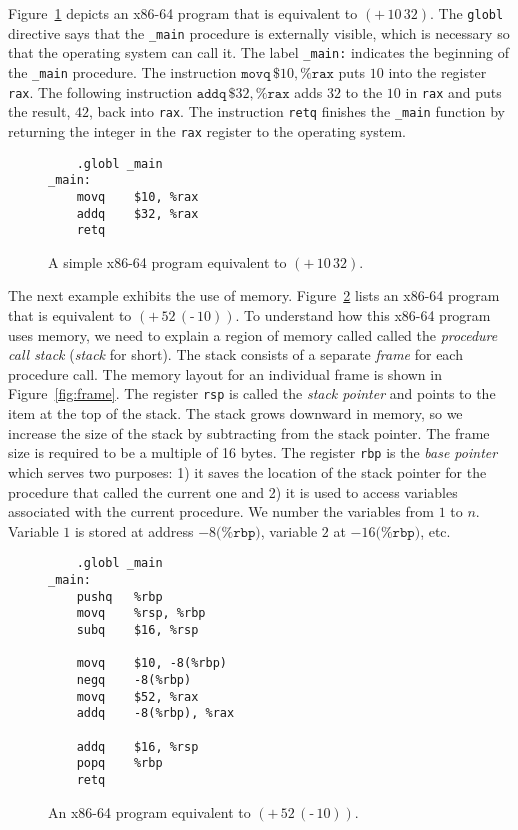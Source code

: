 \documentclass[12pt]{book}
\newcommand{\key}[1]{\texttt{#1}}
\newcommand{\UNIOP}[2]{(\key{#1}\,#2)}
\newcommand{\BINOP}[3]{(\key{#1}\,#2\,#3)}
\begin{document}
Figure~\ref{fig:p0-x86} depicts an x86-64 program that is equivalent
to $\BINOP{+}{10}{32}$. The \key{globl} directive says that the
\key{\_main} procedure is externally visible, which is necessary so
that the operating system can call it. The label \key{\_main:}
indicates the beginning of the \key{\_main} procedure.  The
instruction $\key{movq}\,\$10, \%\key{rax}$ puts $10$ into the
register \key{rax}. The following instruction $\key{addq}\,\key{\$}32,
\key{\%rax}$ adds $32$ to the $10$ in \key{rax} and puts the result,
$42$, back into \key{rax}. The instruction \key{retq} finishes the
\key{\_main} function by returning the integer in the \key{rax}
register to the operating system.

\begin{figure}[htbp]
\centering
\begin{minipage}{0.6\textwidth}
\begin{lstlisting}
	.globl _main
_main:
	movq	$10, %rax
	addq	$32, %rax
	retq
\end{lstlisting}
\end{minipage}
\caption{A simple x86-64 program equivalent to $\BINOP{+}{10}{32}$.}
\label{fig:p0-x86}
\end{figure}

The next example exhibits the use of memory.  Figure~\ref{fig:p1-x86}
lists an x86-64 program that is equivalent to $\BINOP{+}{52}{
  \UNIOP{-}{10} }$. To understand how this x86-64 program uses memory,
we need to explain a region of memory called called the
\emph{procedure call stack} (\emph{stack} for short). The stack
consists of a separate \emph{frame} for each procedure call. The
memory layout for an individual frame is shown in
Figure~\ref{fig:frame}.  The register \key{rsp} is called the
\emph{stack pointer} and points to the item at the top of the
stack. The stack grows downward in memory, so we increase the size of
the stack by subtracting from the stack pointer. The frame size is
required to be a multiple of 16 bytes. The register \key{rbp} is the
\emph{base pointer} which serves two purposes: 1) it saves the
location of the stack pointer for the procedure that called the
current one and 2) it is used to access variables associated with the
current procedure. We number the variables from $1$ to $n$. Variable
$1$ is stored at address $-8\key{(\%rbp)}$, variable $2$ at
$-16\key{(\%rbp)}$, etc.

\begin{figure}
\centering
\begin{minipage}{0.6\textwidth}
\begin{lstlisting}
	.globl _main
_main:
	pushq	%rbp
	movq	%rsp, %rbp
	subq	$16, %rsp

	movq	$10, -8(%rbp)
	negq	-8(%rbp)
	movq	$52, %rax
	addq	-8(%rbp), %rax

	addq	$16, %rsp
	popq	%rbp
	retq
\end{lstlisting}
\end{minipage}
\caption{An x86-64 program equivalent to $\BINOP{+}{52}{\UNIOP{-}{10} }$.}
\label{fig:p1-x86}
\end{figure}
\end{document}
